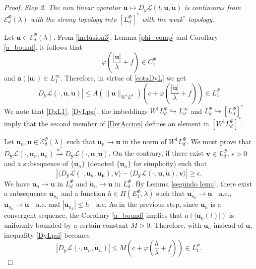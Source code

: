 \documentclass[twoside]{article}
\theoremstyle{remark}
\newcommand{\lphi}{L^{\Phi}}
\newcommand{\lpsi}{L^{\Psi}}
\newcommand{\ephi}{E^{\Phi}}
\newcommand{\wphi}{W^{1}\lphi}
\newcommand{\domi}{\mathcal{E}^{\Phi}_d(\lambda)}
\renewcommand{\b}[1]{\boldsymbol{#1}}
\renewcommand{\leq}{\leqslant}
\begin{document}
\begin{proof}
\noindent\emph{Step 2. The non linear operator   $\b{u}
 \mapsto  D_{y}\mathcal{L}(t,\b{u},\b{\dot{u}})$ is continuous from $\domi$ with the strong topology  into $\left[\lphi_d\right]^*$  with the weak$^*$ topology.}

 Let $\b{u}\in \domi$.  From  \eqref{inclusion3}, Lemma \ref{phi_comp} and Corollary \ref{a_bound}, it follows that 
\begin{equation}\label{AcotOperphi}
\varphi\left(\frac{|\b{\dot{u}}|}{\lambda}+f\right)\in C^{\Psi}_1
\end{equation}
and $\b{a}(|\b{u}|)\in L^{\infty}_1$. 
Therefore, in virtue of  \eqref{cotaDyL} we get
\begin{equation}\label{DyLpsi}
   \left|D_{\b{y}}\mathcal{L}(\cdot,\b{u},\b{\dot{u}})\right|\leq  A(\|\b{u}\|_{\wphi} )  \left(c+\varphi\left( \frac{|\b{\dot{u}}|}{\lambda}+f\right  ) \right)\in\lpsi_1.
\end{equation}
 We note that \eqref{DxL1},  \eqref{DyLpsi}, the imbeddings $\wphi_d \hookrightarrow L_d^{\infty}$ and  $\lpsi_d\hookrightarrow  \left[\lphi_d\right]^*$ imply that the second member of
\eqref{DerAccion} defines an element in $\left[\wphi_d\right]^*$.

Let $\b{u}_n,\b{u}\in \domi$ such that $\b{u}_n\to \b{u}$ in the norm of $\wphi_d$. 
We must prove that  $D_{\b{y}}\mathcal{L}(\cdot,\b{u}_n,\dot{\b{u}_n})\overset{w^*}{\rightharpoonup} D_{\b{y}}\mathcal{L}(\cdot,\b{u},\b{\dot{u}})$. On the contrary, if there exist $\b{v}\in\lphi_d$, $\epsilon>0$ and a subsequence of $\{\b{u}_n\}$ (denoted  $\{\b{u}_n\}$ for simplicity)  such that
\begin{equation}\label{cota_eps}
 \left| \langle D_{\b{y}}\mathcal{L}(\cdot,\b{u}_n,\b{\dot{u}_n}),\b{v} \rangle - \langle  D_{\b{y}}\mathcal{L}(\cdot,\b{u},\b{\dot{u}}),\b{v} \rangle\right|\geq \epsilon.
\end{equation}
We have $\b{u}_n\rightarrow \b{u}$ in $\lphi_d$ and
$\b{\dot{u}}_n\rightarrow \b{\dot{u}}$ in $\lphi_d$. By Lemma \ref{segundo lema}, there exist a subsequence $\b{u}_{n_k}$ and a function $h\in \Pi(\ephi_1,\lambda)$ such that $\b{u}_{n_k}\rightarrow \b{u} \quad\text{a.e.}$, $\b{\dot{u}}_{n_k}\rightarrow \b{\dot{u}} \quad\text{a.e.}$ and $|\b{\dot{u}}_{n_k}|\leq h\quad\text{a.e.}$ 
As in the previous step, since $\b{u}_n$ is a convergent sequence, the Corollary \ref{a_bound} implies that $a(|\b{u}_n(t)|)$ is uniformly bounded by a certain constant $M>0$. 
Therefore,  with $\b{u}_n$ instead of $\b{u}$, inequality  \eqref{DyLpsi} becomes  
\begin{equation}\label{Dy-suc}
  \left | D_{\b{y}}\mathcal{L}(\cdot,\b{u}_n,\b{\dot{u}}_n)  \right| 
	\leq M\left(c+\varphi\left(\frac{h}{\lambda}+f\right)\right)\in \lpsi_1.
\end{equation}


\end{proof}
\end{document}
